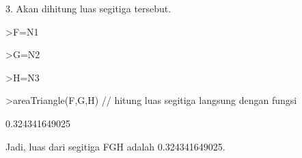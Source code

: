 \documentclass[12pt,arial,letterpaper]{book}
\begin{document}
\begin{eulercomment}
\begin{eulercomment}
\begin{eulercomment}
\begin{eulercomment}
\begin{eulercomment}
\begin{eulercomment}
\begin{eulercomment}
\begin{eulercomment}
\begin{eulercomment}
\begin{eulercomment}
\begin{eulercomment}
\begin{eulercomment}
\begin{eulercomment}
\begin{eulercomment}
\begin{eulercomment}
\begin{eulercomment}
\begin{eulercomment}
\begin{eulercomment}
\begin{eulercomment}
\begin{eulercomment}
\begin{eulercomment}
\begin{eulercomment}
\begin{eulercomment}
\begin{eulercomment}
\begin{eulercomment}
3. Akan dihitung luas segitiga tersebut.
\end{eulercomment}
\begin{eulerprompt}
>F=N1
\end{eulerprompt}
\begin{euleroutput}
  [0.5,  0.5]
\end{euleroutput}
\begin{eulerprompt}
>G=N2
\end{eulerprompt}
\begin{euleroutput}
  [0.632456,  1.31623]
\end{euleroutput}
\begin{eulerprompt}
>H=N3
\end{eulerprompt}
\begin{euleroutput}
  [1.31623,  0.632456]
\end{euleroutput}
\begin{eulerprompt}
>areaTriangle(F,G,H) // hitung luas segitiga langsung dengan fungsi
\end{eulerprompt}
\begin{euleroutput}
  0.324341649025
\end{euleroutput}
\begin{eulercomment}
Jadi, luas dari segitiga FGH adalah 0.324341649025.


\end{eulercomment}
\end{eulercomment}
\end{eulercomment}
\end{eulercomment}
\end{eulercomment}
\end{eulercomment}
\end{eulercomment}
\end{eulercomment}
\end{eulercomment}
\end{eulercomment}
\end{eulercomment}
\end{eulercomment}
\end{eulercomment}
\end{eulercomment}
\end{eulercomment}
\end{eulercomment}
\end{eulercomment}
\end{eulercomment}
\end{eulercomment}
\end{eulercomment}
\end{eulercomment}
\end{eulercomment}
\end{eulercomment}
\end{eulercomment}
\end{eulercomment}
\end{document}
